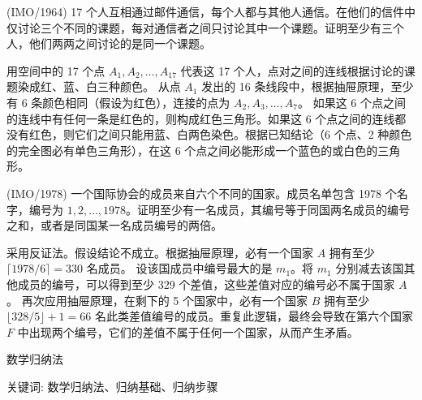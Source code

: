 \begin{questions}
\question (IMO/1964) 17 个人互相通过邮件通信，每个人都与其他人通信。在他们的信件中仅讨论三个不同的课题，每对通信者之间只讨论其中一个课题。证明至少有三个人，他们两两之间讨论的是同一个课题。
\begin{solution}
用空间中的 17 个点 $A_1, A_2, \dots, A_{17}$ 代表这 17 个人，点对之间的连线根据讨论的课题染成红、蓝、白三种颜色。
从点 $A_1$ 发出的 16 条线段中，根据抽屉原理，至少有 6 条颜色相同（假设为红色），连接的点为 $A_2, A_3, \dots, A_7$。
如果这 6 个点之间的连线中有任何一条是红色的，则构成红色三角形。如果这 6 个点之间的连线都没有红色，则它们之间只能用蓝、白两色染色。根据已知结论（6 个点、2 种颜色的完全图必有单色三角形），在这 6 个点之间必能形成一个蓝色的或白色的三角形。
\end{solution}

\question (IMO/1978) 一个国际协会的成员来自六个不同的国家。成员名单包含 1978 个名字，编号为 $1, 2, \dots, 1978$。证明至少有一名成员，其编号等于同国两名成员的编号之和，或者是同国某一名成员编号的两倍。
\begin{solution}
采用反证法。假设结论不成立。根据抽屉原理，必有一个国家 $A$ 拥有至少 $\lceil 1978/6 \rceil = 330$ 名成员。
设该国成员中编号最大的是 $m_1$。将 $m_1$ 分别减去该国其他成员的编号，可以得到至少 329 个差值，这些差值对应的编号必不属于国家 $A$。
再次应用抽屉原理，在剩下的 5 个国家中，必有一个国家 $B$ 拥有至少 $\lfloor 328/5 \rfloor + 1 = 66$ 名此类差值编号的成员。重复此逻辑，最终会导致在第六个国家 $F$ 中出现两个编号，它们的差值不属于任何一个国家，从而产生矛盾。
\end{solution}
\end{questions}
\pagebreak

\begin{center}
  {\fontsize{30pt}{26pt}\selectfont
    \hypertarget{数学归纳法}{数学归纳法} \label{数学归纳法}
  }
\end{center}
\separator
\begin{center}
    关键词: 数学归纳法、归纳基础、归纳步骤
\end{center}
\vspace{0.5pt}

